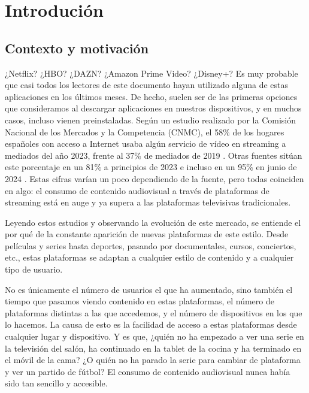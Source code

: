 \chapter{Introdución}
\label{chap:introducion}

\section{Contexto y motivación}
\label{sec:contexto}


¿Netflix? ¿HBO? ¿DAZN? ¿Amazon Prime Video? ¿Disney+? Es muy probable que casi todos los lectores de este documento 
hayan utilizado alguna de estas aplicaciones en los últimos meses. De hecho, suelen ser de las primeras opciones que 
consideramos al descargar aplicaciones en nuestros dispositivos, y en muchos casos, incluso vienen preinstaladas. 
Según un estudio realizado por la Comisión Nacional de los Mercados y la Competencia (CNMC), el 58\% de los hogares 
españoles con acceso a Internet usaba algún servicio de vídeo en streaming a mediados del año 2023, frente al 37\% 
de mediados de 2019 \cite{CNMC}. Otras fuentes sitúan este porcentaje en un 81\% a principios de 2023 \cite{Streaming2023}
 e incluso en un 95\% en junio de 2024 \cite{Streaming2024}. Estas cifras varían un poco dependiendo de la fuente, 
 pero todas coinciden en algo: el consumo de contenido audiovisual a través de plataformas de streaming está en 
 auge y ya supera a las plataformas televisivas tradicionales. 

Leyendo estos estudios y observando la evolución de este mercado, se entiende el por qué de la constante aparición de 
nuevas plataformas de este estilo. Desde películas y series hasta deportes, pasando por documentales, cursos, conciertos, 
etc., estas plataformas se adaptan a cualquier estilo de contenido y a cualquier tipo de usuario.

No es únicamente el número de usuarios el que ha aumentado, sino también el tiempo que pasamos viendo contenido en 
estas plataformas, el número de plataformas distintas a las que accedemos, y el número de dispositivos en los que 
lo hacemos. La causa de esto es la facilidad de acceso a estas plataformas desde cualquier lugar y dispositivo. Y 
es que, ¿quién no ha empezado a ver una serie en la televisión del salón, ha continuado en la tablet de la cocina
 y ha terminado en el móvil de la cama? ¿O quién no ha parado la serie para cambiar de plataforma y ver un partido 
 de fútbol? El consumo de contenido audiovisual nunca había sido tan sencillo y accesible.

